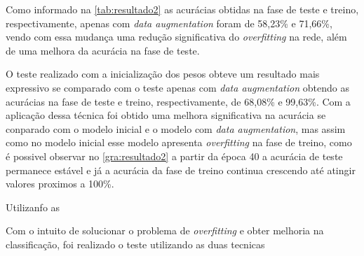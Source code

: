 \par Como informado na \autoref{tab:resultado2} as acurácias obtidas na fase de teste e treino, respectivamente, apenas com \textit{data augmentation} foram de 58,23\% e 71,66\%, vendo com essa mudança uma redução significativa do \textit{overfitting} na rede, além de uma melhora da acurácia na fase de teste.
\par O teste realizado com a inicialização dos pesos obteve um resultado mais expressivo se comparado com o teste apenas com \textit{data augmentation} obtendo as acurácias na fase de teste e treino, respectivamente, de 68,08\% e 99,63\%. Com a aplicação dessa técnica foi obtido uma melhora significativa na acurácia se conparado com o modelo inicial e o modelo com \textit{data augmentation}, mas assim como no modelo inicial esse modelo apresenta \textit{overfitting} na fase de treino, como é possivel observar no \autoref{gra:resultado2} a partir da época 40 a acurácia de teste permanece estável e já a acurácia da fase de treino continua crescendo até atingir valores proximos a 100\%.

\par Utilizanfo as 

Com o intuito de solucionar o problema de \textit{overfitting} e obter melhoria na classificação, foi realizado o teste utilizando as duas tecnicas 


 


